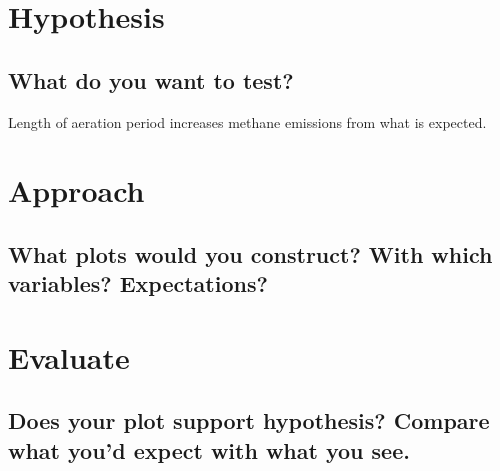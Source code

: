 \documentclass[12 pt]{article}
\begin{document}
\section{Hypothesis}
\subsection*{What do you want to test?}
Length of aeration period increases methane emissions from what is expected. 

\section{Approach}
\subsection*{What plots would you construct? With which variables? Expectations?}


\section{Evaluate}
\subsection*{Does your plot support hypothesis? Compare what you'd expect with what you see.}
\end{document}
